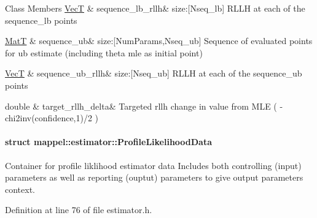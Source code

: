 \begin{DoxyFields}{Class Members}
\hyperlink{namespacemappel_a2225ad69f358daa3f4f99282a35b9a3a}{VecT}\hypertarget{namespacemappel_1_1estimator_a494ce70c7c79260ba82816f28c67659b}{}\label{namespacemappel_1_1estimator_a494ce70c7c79260ba82816f28c67659b}
&
sequence\+\_\+lb\+\_\+rllh&
size\+:\mbox{[}Nseq\+\_\+lb\mbox{]} R\+L\+LH at each of the sequence\+\_\+lb points \\
\hline

\hyperlink{namespacemappel_a7091ab87c528041f7e2027195fad8915}{MatT}\hypertarget{namespacemappel_1_1estimator_a228d934c7ce4448d22d93dd3cf3843d5}{}\label{namespacemappel_1_1estimator_a228d934c7ce4448d22d93dd3cf3843d5}
&
sequence\+\_\+ub&
size\+:\mbox{[}Num\+Params,Nseq\+\_\+ub\mbox{]} Sequence of evaluated points for ub estimate (including theta mle as initial point) \\
\hline

\hyperlink{namespacemappel_a2225ad69f358daa3f4f99282a35b9a3a}{VecT}\hypertarget{namespacemappel_1_1estimator_ace894418986139f62b6d0c267db852b5}{}\label{namespacemappel_1_1estimator_ace894418986139f62b6d0c267db852b5}
&
sequence\+\_\+ub\+\_\+rllh&
size\+:\mbox{[}Nseq\+\_\+ub\mbox{]} R\+L\+LH at each of the sequence\+\_\+ub points \\
\hline

double\hypertarget{namespacemappel_1_1estimator_aaceb78a7bb02e7d5bf776d908f0051f9}{}\label{namespacemappel_1_1estimator_aaceb78a7bb02e7d5bf776d908f0051f9}
&
target\+\_\+rllh\+\_\+delta&
Targeted rllh change in value from M\+LE ( -\/chi2inv(confidence,1)/2 ) \\
\hline

\end{DoxyFields}
\label{structmappel_1_1estimator_1_1ProfileLikelihoodData}
\hypertarget{namespacemappel_1_1estimator_structmappel_1_1estimator_1_1ProfileLikelihoodData}{}
\paragraph{struct mappel\+:\+:estimator\+:\+:Profile\+Likelihood\+Data}
Container for profile liklihood estimator data Includes both controlling (input) parameters as well as reporting (ouptut) parameters to give output parameters context. 

Definition at line 76 of file estimator.\+h.

